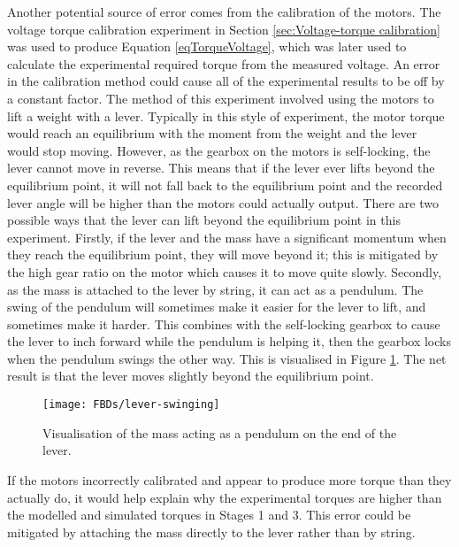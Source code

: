 Another potential source of error comes from the calibration of the motors. The voltage torque calibration experiment in Section \ref{sec:Voltage-torque calibration} was used to produce Equation \ref{eqTorqueVoltage}, which was later used to calculate the experimental required torque from the measured voltage. An error in the calibration method could cause all of the experimental results to be off by a constant factor. The method of this experiment involved using the motors to lift a weight with a lever. Typically in this style of experiment, the motor torque would reach an equilibrium with the moment from the weight and the lever would stop moving. However, as the gearbox on the motors is self-locking, the lever cannot move in reverse. This means that if the lever ever lifts beyond the equilibrium point, it will not fall back to the equilibrium point and the recorded lever angle will be higher than the motors could actually output. There are two possible ways that the lever can lift beyond the equilibrium point in this experiment. Firstly, if the lever and the mass have a significant momentum when they reach the equilibrium point, they will move beyond it; this is mitigated by the high gear ratio on the motor which causes it to move quite slowly. Secondly, as the mass is attached to the lever by string, it can act as a pendulum. The swing of the pendulum will sometimes make it easier for the lever to lift, and sometimes make it harder. This combines with the self-locking gearbox to cause the lever to inch forward while the pendulum is helping it, then the gearbox locks when the pendulum swings the other way. This is visualised in Figure \ref{fig:lever-swinging}. The net result is that the lever moves slightly beyond the equilibrium point. \\

\begin{figure}[!h]
	\centering
	\texttt{[image: FBDs/lever-swinging]}
	\caption{Visualisation of the mass acting as a pendulum on the end of the lever.}
	\label{fig:lever-swinging}
\end{figure}

If the motors incorrectly calibrated and appear to produce more torque than they actually do, it would help explain why the experimental torques are higher than the modelled and simulated torques in Stages 1 and 3. This error could be mitigated by attaching the mass directly to the lever rather than by string.

